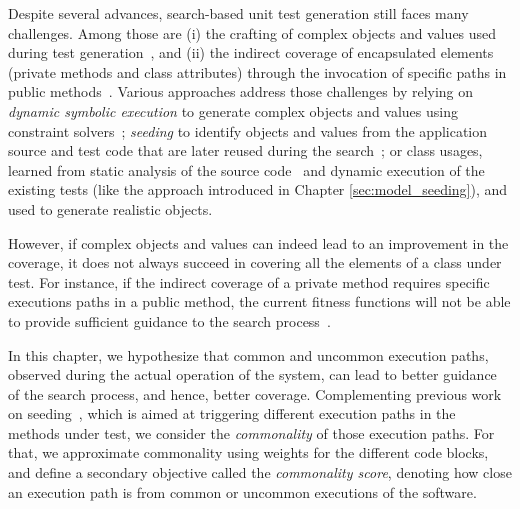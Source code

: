 


Despite several advances, search-based unit test generation still faces many challenges. Among those are (i) the crafting of complex objects and values used during test generation~\cite{almasi2017industrial}, and 
(ii) the indirect coverage of encapsulated elements (\eg private methods and class attributes) through the invocation of specific paths in public methods~\cite{Salahirad2019}. 
Various approaches address those challenges by relying on \emph{dynamic symbolic execution} to generate complex objects and values using constraint solvers~\cite{Inkumsah2008, Lakhotia2010, Galeotti2013, Gouraud2001}; 
\emph{seeding} to identify objects and values from the application source and test code that are later reused during the search~\cite{Rojas2016}; 
or class usages, learned from static analysis of the source code~\cite{Fraser2011a} and dynamic execution of the existing tests (like the approach introduced in Chapter \ref{sec:model_seeding}), and used to generate realistic objects.

However, if complex objects and values can indeed lead to an improvement in the coverage, it does not always succeed in covering all the elements of a class under test. For instance, if the indirect coverage of a private method requires specific executions paths in a public method, the current fitness functions will not be able to provide sufficient guidance to the search process~\cite{Salahirad2019}. 

In this chapter, we hypothesize that common and uncommon execution paths, observed during the actual operation of the system, can lead to better guidance of the search process, and hence, better coverage. Complementing previous work on seeding~\cite{Rojas2016}, which is aimed at triggering different execution paths in the methods under test, we consider the \emph{commonality} of those execution paths. For that, we approximate commonality using weights for the different code blocks, and define a secondary objective called the \emph{commonality score}, denoting how close an execution path is from common or uncommon executions of the software.

